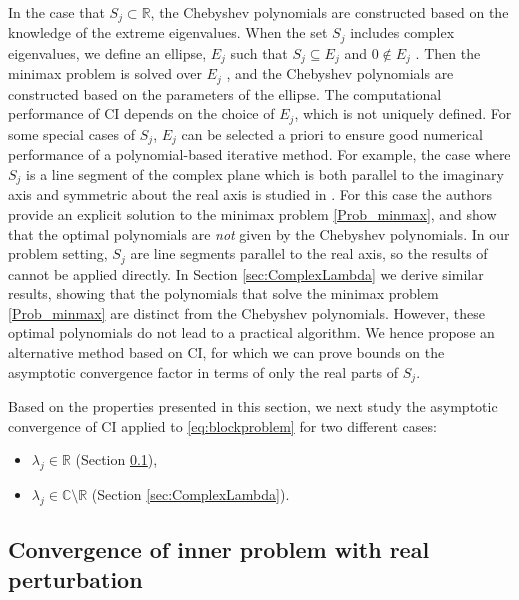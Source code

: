 \documentclass{article}
\theoremstyle{definition}
\begin{document}
{		In the case that $S_j\subset \mathbb{R}$, the Chebyshev polynomials are constructed based on the knowledge of the extreme eigenvalues. 
		When the set $S_j$ includes complex eigenvalues, we define an ellipse, $E_j$ such that $S_j\subseteq E_j$ and $0\notin E_j$ \cite{gutknecht2002chebyshev, manteuffel1977tchebychev, gergelits2014composite}. Then the minimax problem is solved over $E_j$ \cite{axelsson1996iterative}, and the Chebyshev polynomials are constructed based on the parameters of the ellipse. The computational performance of CI depends on the choice of $E_j$, which is not uniquely defined. For some special cases of $S_j$, $E_j$ can be selected a priori to ensure good numerical performance of a polynomial-based iterative method. For example, the case where $S_j$ is a line segment of the complex plane which is both parallel to the imaginary axis and symmetric about the real axis is studied in \cite{freund1986class}. For this case the authors provide an explicit solution to the minimax problem \eqref{Prob_minmax}, and show that the optimal polynomials are \textit{not} given by the Chebyshev polynomials. In our problem setting, $S_j$ are line segments parallel to the real axis, so the results of \cite{freund1986class} cannot be applied directly. In Section \ref{sec:ComplexLambda} we derive similar results, showing that the polynomials that solve the minimax problem \eqref{Prob_minmax} are distinct from the Chebyshev polynomials. However, these optimal polynomials do not lead to a practical algorithm. We hence propose an alternative method based on CI, for which we can prove bounds on the asymptotic convergence factor in terms of only the real parts of $S_j$.
		
		
		Based on the properties presented in this section, we next study the asymptotic convergence of CI applied to \eqref{eq:blockproblem} for two different cases:
		\begin{itemize}
			\item $\lambda_j\in\mathbb{R}$ (Section \ref{sec:RealLambda}),
			\item $\lambda_j \in \mathbb{C}\setminus \mathbb{R}$ (Section \ref{sec:ComplexLambda}).
		\end{itemize}
		
		
		
		\subsection{Convergence of inner problem with real perturbation}\label{sec:RealLambda}
		
}
\end{document}
